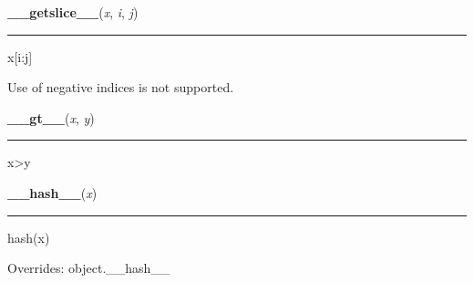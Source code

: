     \label{resource:struct_rusage:__getslice__}

    \vspace{0.5ex}

\hspace{.8\funcindent}\begin{boxedminipage}{\funcwidth}

    \raggedright \textbf{\_\_getslice\_\_}(\textit{x}, \textit{i}, \textit{j})

    \vspace{-1.5ex}

    \rule{\textwidth}{0.5\fboxrule}
\setlength{\parskip}{2ex}
    x[i:j]

    Use of negative indices is not supported.

\setlength{\parskip}{1ex}
    \end{boxedminipage}

    \label{resource:struct_rusage:__gt__}

    \vspace{0.5ex}

\hspace{.8\funcindent}\begin{boxedminipage}{\funcwidth}

    \raggedright \textbf{\_\_gt\_\_}(\textit{x}, \textit{y})

    \vspace{-1.5ex}

    \rule{\textwidth}{0.5\fboxrule}
\setlength{\parskip}{2ex}
    x{\textgreater}y

\setlength{\parskip}{1ex}
    \end{boxedminipage}

    \vspace{0.5ex}

\hspace{.8\funcindent}\begin{boxedminipage}{\funcwidth}

    \raggedright \textbf{\_\_hash\_\_}(\textit{x})

    \vspace{-1.5ex}

    \rule{\textwidth}{0.5\fboxrule}
\setlength{\parskip}{2ex}
    hash(x)

\setlength{\parskip}{1ex}
      Overrides: object.\_\_hash\_\_

    \end{boxedminipage}

